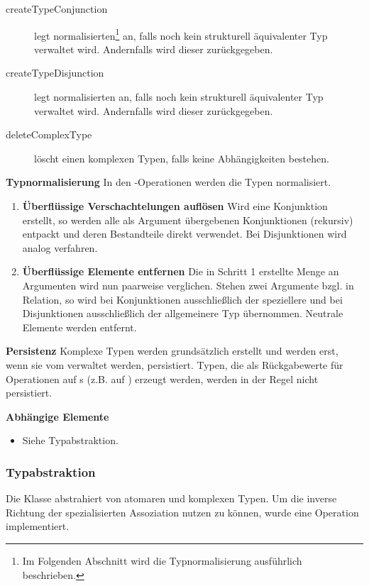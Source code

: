\begin{description}
\item[createTypeConjunction] legt normalisierten\footnote{Im Folgenden Abschnitt wird die Typnormalisierung ausführlich beschrieben.}  an, falls noch kein strukturell äquivalenter Typ verwaltet wird. Andernfalls wird dieser zurückgegeben.
\item[createTypeDisjunction] legt normalisierten  an, falls noch kein strukturell äquivalenter Typ verwaltet wird. Andernfalls wird dieser zurückgegeben.
\item[deleteComplexType] löscht einen komplexen Typen, falls keine Abhängigkeiten bestehen.
\end{description}


\textbf{Typnormalisierung} \newline
In den -Operationen werden die Typen normalisiert. 
\begin{enumerate}
\item \textbf{Überflüssige Verschachtelungen auflösen}  \newline 
	Wird eine Konjunktion erstellt, so werden alle als Argument übergebenen Konjunktionen (rekursiv) entpackt und deren Bestandteile direkt verwendet.
	Bei Disjunktionen wird analog verfahren. 
\item \textbf{Überflüssige Elemente entfernen}  \newline 
	Die in Schritt 1 erstellte Menge an Argumenten wird nun paarweise verglichen. Stehen zwei Argumente bzgl.  in Relation, so wird 
	bei Konjunktionen ausschließlich der speziellere und bei Disjunktionen ausschließlich der allgemeinere Typ übernommen. Neutrale Elemente werden 
	entfernt. 
\end{enumerate} 

\textbf{Persistenz} \newline
Komplexe Typen werden grundsätzlich  erstellt und werden erst, wenn sie vom  verwaltet werden, persistiert. 
Typen, die als Rückgabewerte für Operationen auf s (z.B.  auf ) erzeugt werden, 
werden in der Regel nicht persistiert. 

\textbf{Abhängige Elemente}
\begin{itemize}
	\item Siehe Typabstraktion.
\end{itemize}

\subsubsection{Typabstraktion}
Die Klasse  abstrahiert von atomaren und komplexen Typen. Um die inverse Richtung der spezialisierten Assoziation 
 nutzen zu können, wurde eine Operation  implementiert. 

